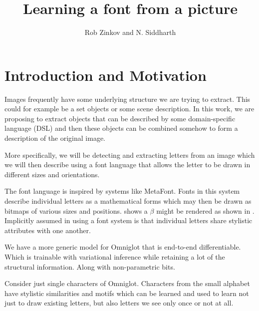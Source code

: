 \documentclass{article}
\title{Learning a font from a picture}
\author{Rob Zinkov and N. Siddharth}
\date{}
\begin{document}
\maketitle

\section{Introduction and Motivation}

   
Images frequently have some underlying structure we are trying to
extract. This could for example be a set objects or some scene
description. In this work, we are proposing to extract objects that
can be described by some domain-specific language (DSL) and then
these objects can be combined somehow to form a description of
the original image.

More specifically, we will be detecting and extracting letters from an
image which we will then describe using a font language that allows
the letter to be drawn in different sizes and orientations.

The font language is inspired by systems like
MetaFont\citep{knuth1982concept}. Fonts in this system describe individual letters
as a mathematical forms which may then be drawn as bitmaps of various sizes and positions.
 shows a $\beta$ might be rendered as shown in .
Implicitly assumed in using a font system is that individual letters share stylistic
attributes with one another.

We have a more generic model for Omniglot that is end-to-end differentiable. Which is
trainable with variational inference while retaining a lot of the structural
information. Along with non-parametric bits.

Consider just single characters of Omniglot. Characters from the small alphabet have stylistic
similarities and motifs which can be learned and used to learn not just to draw existing
letters, but also letters we see only once or not at all.
\end{document}
